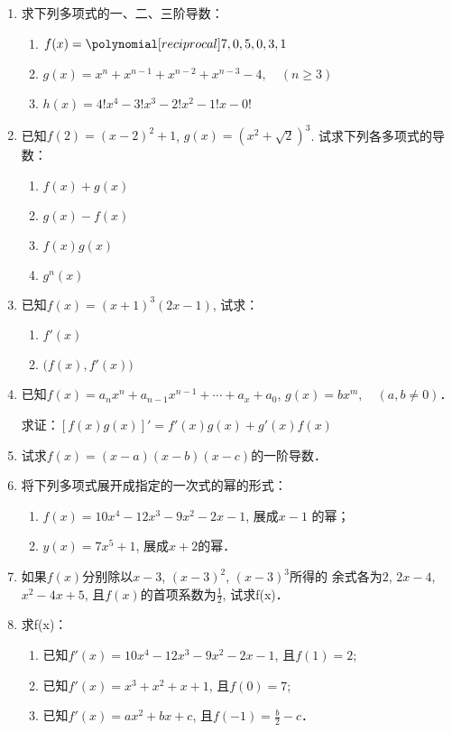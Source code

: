 \begin{enumerate}
    \item 求下列多项式的一、二、三阶导数：
\begin{enumerate}
    \item $f(x)=\poly{7,0,5,0,3,1}$
    \item $g(x)=x^n+x^{n-1}+x^{n-2}+x^{n-3}-4,\quad (n\ge 3)$
    \item $h(x)=4!x^4-3!x^3-2!x^2-1!x-0!$
\end{enumerate}
\item 已知$f(2)=(x-2)^2+1$, $g(x)=(x^2+\sqrt{2})^3$.
试求下列各多项式的导数：
\begin{multicols}{2}
\begin{enumerate}
    \item $f(x)+g(x)$
    \item $g (x) -f (x)$
    \item $f (x) g (x)$
    \item $g^n(x)$
\end{enumerate}
\end{multicols}

\item 已知$f(x)=(x+1)^3(2x-1)$, 试求：
\begin{multicols}{2}
    \begin{enumerate}
        \item $f'(x)$
        \item $\big(f(x),f'(x)\big)$
    \end{enumerate}
    \end{multicols}
\item 已知$f(x)=a_nx^n+a_{n-1}x^{n-1}+\cdots+a_x+a_0$, 
$g(x)=bx^m,\quad (a,b\ne 0)$．

求证：$[f(x)g(x)]'=f'(x)g(x)+g'(x)f(x)$

\item 试求$f(x)=(x-a)(x-b)(x-c)$的一阶导数．
\item 将下列多项式展开成指定的一次式的幂的形式：
\begin{enumerate}
\item $f(x)=10x^4-12x^3-9x^2-2x-1$, 展成$x-1$
的幂；
\item $y(x)=7x^5+1$, 展成$x+2$的幂．
\end{enumerate}

\item 如果$f(x)$分别除以$x-3$, $(x-3)^2$, $(x-3)^3$所得的
余式各为$2$, $2x-4$, $x^2-4x+5$, 且$f(x)$的首项系数为$\frac{1}{2}$, 试求f(x)．
\item 求f(x)：
\begin{enumerate}
\item 已知$f'(x)=10x^4-12x^3-9x^2-2x-1$, 
且$f(1)=2$;
\item 已知$f'(x)=x^3+x^2+x+1$, 且$f(0)=7$;
\item 已知$f'(x)=ax^2+bx+c$, 且$f(-1)=\frac{b}{2}-c$．
\end{enumerate}


\end{enumerate}
